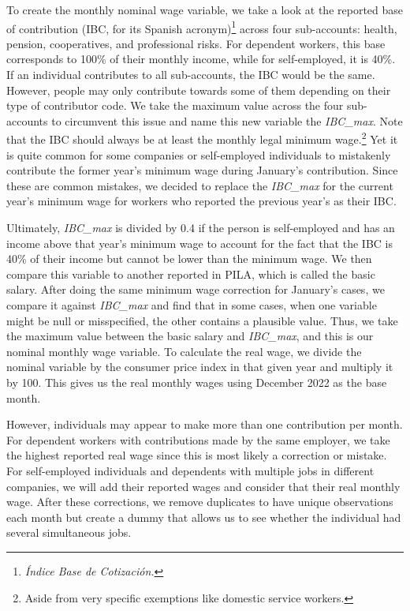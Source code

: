 \documentclass[12pt, a4paper]{article}
\begin{document}
To create the monthly nominal wage variable, we take a look at the reported base of contribution (IBC, for its Spanish acronym)\footnote{\textit{Índice Base de Cotización.}} across four sub-accounts: health, pension, cooperatives, and professional risks. For dependent workers, this base corresponds to 100\% of their monthly income, while for self-employed, it is 40\%. If an individual contributes to all sub-accounts, the IBC would be the same. However, people may only contribute towards some of them depending on their type of contributor code. We take the maximum value across the four sub-accounts to circumvent this issue and name this new variable the \textit{IBC\_max}. Note that the IBC should always be at least the monthly legal minimum wage.\footnote{Aside from very specific exemptions like domestic service workers.} Yet it is quite common for some companies or self-employed individuals to mistakenly contribute the former year's minimum wage during January's contribution. Since these are common mistakes, we decided to replace the \textit{IBC\_max} for the current year's minimum wage for workers who reported the previous year's as their IBC. 

Ultimately, \textit{IBC\_max} is divided by 0.4 if the person is self-employed and has an income above that year's minimum wage to account for the fact that the IBC is 40\% of their income but cannot be lower than the minimum wage. We then compare this variable to another reported in PILA, which is called the basic salary. After doing the same minimum wage correction for January's cases, we compare it against \textit{IBC\_max} and find that in some cases, when one variable might be null or misspecified, the other contains a plausible value. Thus, we take the maximum value between the basic salary and \textit{IBC\_max}, and this is our nominal monthly wage variable. To calculate the real wage, we divide the nominal variable by the consumer price index in that given year and multiply it by 100. This gives us the real monthly wages using December 2022 as the base month.

However, individuals may appear to make more than one contribution per month. For dependent workers with contributions made by the same employer, we take the highest reported real wage since this is most likely a correction or mistake. For self-employed individuals and dependents with multiple jobs in different companies, we will add their reported wages and consider that their real monthly wage. After these corrections, we remove duplicates to have unique observations each month but create a dummy that allows us to see whether the individual had several simultaneous jobs.
\end{document}
